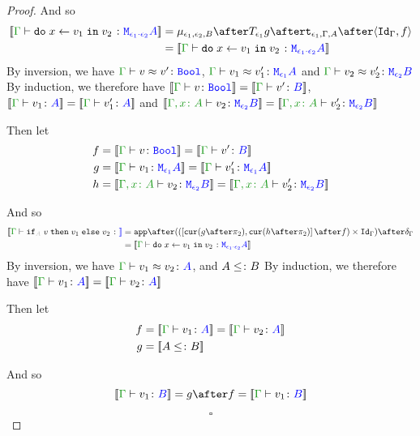 \documentclass{report}
\begin{document}
\begin{framed}
\begin{proof}
        
        
        And so
        \begin{equation}
            \begin{split}
                \deno{\gtyperelation{\doin{x}{v_1}{v_2}}{\M{\e_1\dot\e_2}{A}}} & = \bind{\e_1}{\e_2}{B} \after \T{\e_1}{g} \after \tstrength{\e_1}{\G}{A} \after \pr{\idg}{f}\\
                 & = \deno{\gtyperelation{\doin{x}{v_1}{v_2}}{\M{\e_1\dot\e_2}{A}}}
            \end{split}
        \end{equation}
        By inversion, we have $\gberelation{v}{v'}{\B}$, $\gberelation{v_1}{v_1'}{\M{\e_1}{A}}$ and $\gberelation{v_2}{v_2'}{\M{\e_2}{B}}$
        By induction, we therefore have $\deno{\gtyperelation{v}{\B}} = \deno{\gtyperelation{v'}{B}}$, $\deno{\gtyperelation{v_1}{ A}}= \deno{\gtyperelation{v_1'}{ A}}$ and $\deno{\typerelation{\gax}{v_2}{\M{\e_2}{B}}} = \deno{\typerelation{\gax}{v_2'}{\M{\e_2}{B}}}$
        
        Then let
        \begin{align*}
            f &{}=\deno{\gtyperelation{v}{\B}} = \deno{\gtyperelation{v'}{B}}\\
            g &{}=\deno{\gtyperelation{v_1}{\M{\e_1}{A}}}= \deno{\gtyperelation{v_1'}{\M{\e_1}{A}}}\\
            h &{}=\deno{\typerelation{\gax}{v_2}{\M{\e_2}{B}}} = \deno{\typerelation{\gax}{v_2'}{\M{\e_2}{B}}}
        \end{align*}
        
        
        
        And so
        \begin{equation}
            \begin{split}
                \deno{\gtyperelation{\pifthenelse{A}{v}{v_1}{v_2}}} & = \ifMorph{f}{g}{h}\\
                 & = \deno{\gtyperelation{\doin{x}{v_1}{v_2}}{\M{\e_1\dot\e_2}{A}}}
            \end{split}
        \end{equation}
        By inversion, we have $\gberelation{v_1}{v_2}{A}$, and $A \leq\colon B$ 
        By induction, we therefore have $\deno{\gtyperelation{v_1}{A}} = \deno{\gtyperelation{v_2}{A}}$
        
        Then let
        \begin{align*}
            f &{}=\deno{\gtyperelation{v_1}{A}} = \deno{\gtyperelation{v_2}{A}}\\
            g &{}=\deno{A \subtype B}
        \end{align*}
        
        
        
        And so
        \begin{equation}
                \deno{\gtyperelation{v_1}{B}} = g \after f = \deno{\gtyperelation{v_1}{B}}
        \end{equation}
        
        $$\square$$
    \end{proof}
\end{framed}
\end{document}
